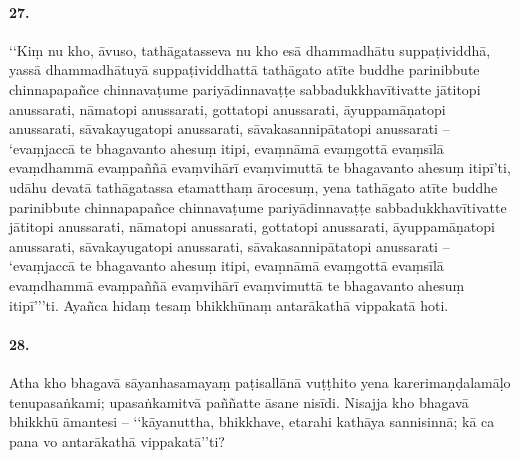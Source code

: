\paragraph{27.} ‘‘Kiṃ nu kho, āvuso, tathāgatasseva nu kho esā dhammadhātu suppaṭividdhā, yassā dhammadhātuyā suppaṭividdhattā tathāgato atīte buddhe parinibbute chinnapapañce chinnavaṭume pariyādinnavaṭṭe sabbadukkhavītivatte jātitopi anussarati, nāmatopi anussarati, gottatopi anussarati, āyuppamāṇatopi anussarati, sāvakayugatopi anussarati, sāvakasannipātatopi anussarati – ‘evaṃjaccā te bhagavanto ahesuṃ itipi, evaṃnāmā evaṃgottā evaṃsīlā evaṃdhammā evaṃpaññā evaṃvihārī evaṃvimuttā te bhagavanto ahesuṃ itipī’ti, udāhu devatā tathāgatassa etamatthaṃ ārocesuṃ, yena tathāgato atīte buddhe parinibbute chinnapapañce chinnavaṭume pariyādinnavaṭṭe sabbadukkhavītivatte jātitopi anussarati, nāmatopi anussarati, gottatopi anussarati, āyuppamāṇatopi anussarati, sāvakayugatopi anussarati, sāvakasannipātatopi anussarati – ‘evaṃjaccā te bhagavanto ahesuṃ itipi, evaṃnāmā evaṃgottā evaṃsīlā evaṃdhammā evaṃpaññā evaṃvihārī evaṃvimuttā te bhagavanto ahesuṃ itipī’’’ti. Ayañca hidaṃ tesaṃ bhikkhūnaṃ antarākathā vippakatā hoti.

\paragraph{28.} Atha kho bhagavā sāyanhasamayaṃ paṭisallānā vuṭṭhito yena karerimaṇḍalamāḷo tenupasaṅkami; upasaṅkamitvā paññatte āsane nisīdi. Nisajja kho bhagavā bhikkhū āmantesi – ‘‘kāyanuttha, bhikkhave, etarahi kathāya sannisinnā; kā ca pana vo antarākathā vippakatā’’ti?


